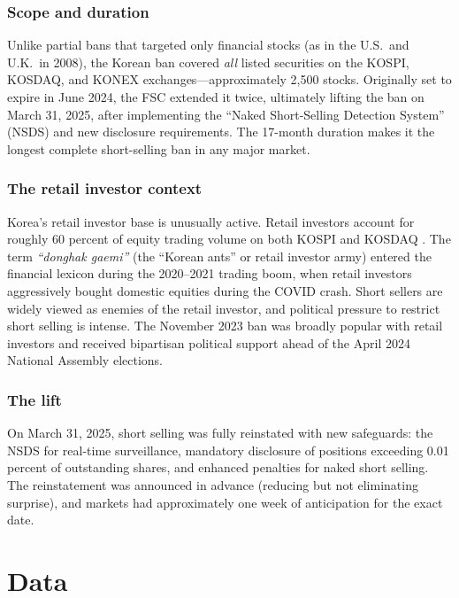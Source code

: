 \documentclass[12pt]{article}
\begin{document}
\subsubsection*{Scope and duration} Unlike partial bans that targeted only financial stocks (as in the U.S.\ and U.K.\ in 2008), the Korean ban covered \textit{all} listed securities on the KOSPI, KOSDAQ, and KONEX exchanges---approximately 2,500 stocks. Originally set to expire in June 2024, the FSC extended it twice, ultimately lifting the ban on March 31, 2025, after implementing the ``Naked Short-Selling Detection System'' (NSDS) and new disclosure requirements. The 17-month duration makes it the longest complete short-selling ban in any major market.

\subsubsection*{The retail investor context} Korea's retail investor base is unusually active. Retail investors account for roughly 60 percent of equity trading volume on both KOSPI and KOSDAQ \citep{kim2023korean}. The term \textit{``donghak gaemi''} (the ``Korean ants'' or retail investor army) entered the financial lexicon during the 2020--2021 trading boom, when retail investors aggressively bought domestic equities during the COVID crash. Short sellers are widely viewed as enemies of the retail investor, and political pressure to restrict short selling is intense. The November 2023 ban was broadly popular with retail investors and received bipartisan political support ahead of the April 2024 National Assembly elections.

\subsubsection*{The lift} On March 31, 2025, short selling was fully reinstated with new safeguards: the NSDS for real-time surveillance, mandatory disclosure of positions exceeding 0.01 percent of outstanding shares, and enhanced penalties for naked short selling. The reinstatement was announced in advance (reducing but not eliminating surprise), and markets had approximately one week of anticipation for the exact date.


\section{Data}
\label{sec:data}
\end{document}
